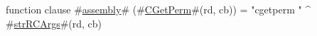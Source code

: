function clause #\hyperref[sailMIPSzassembly]{assembly}# (#\hyperref[sailMIPSzCGetPerm]{CGetPerm}#(rd, cb)) = "cgetperm " ^ #\hyperref[sailMIPSzstrRCArgs]{strRCArgs}#(rd, cb)
